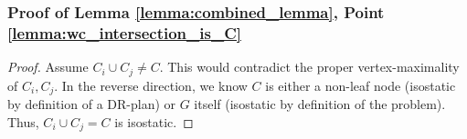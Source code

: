








\subsubsection{Proof of Lemma \ref{lemma:combined_lemma}, Point \ref{lemma:wc_intersection_is_C}}

\begin{proof}
    Assume $C_i\cup C_j \neq C$. This would contradict the proper vertex-maximality of $C_i,C_j$.
    In the reverse direction, we know $C$ is either a non-leaf node (isostatic by definition of a DR-plan) or $G$ itself (isostatic by definition of the problem). Thus, $C_i\cup C_j=C$ is isostatic.
\end{proof}


